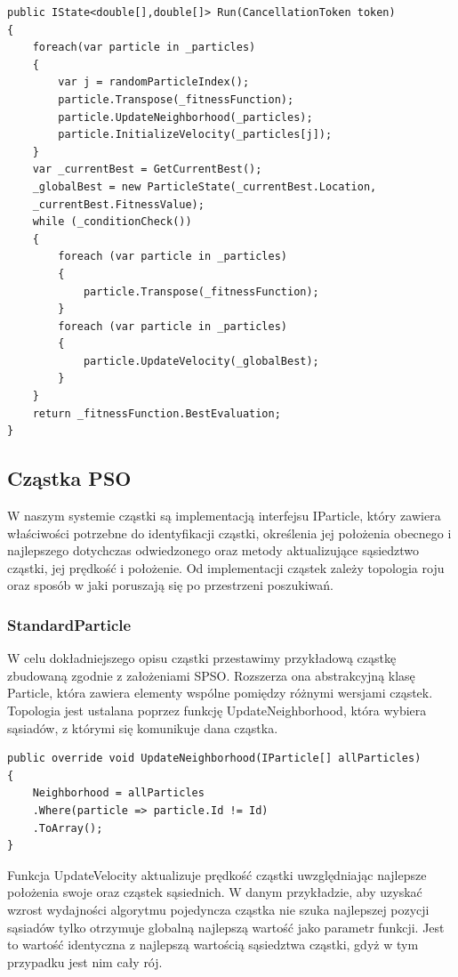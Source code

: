 \documentclass[12pt, twoside, openany, abstract=on]{report}
\theoremstyle{definition}
\begin{document}
\lstset{style=sharpc}
\begin{lstlisting}[frame=single]
public IState<double[],double[]> Run(CancellationToken token)
{
	foreach(var particle in _particles)
	{
		var j = randomParticleIndex();	      
		particle.Transpose(_fitnessFunction);
	    particle.UpdateNeighborhood(_particles);
		particle.InitializeVelocity(_particles[j]);
	}
	var _currentBest = GetCurrentBest();
	_globalBest = new ParticleState(_currentBest.Location,
	_currentBest.FitnessValue);
	while (_conditionCheck())
	{
		foreach (var particle in _particles)
		{
	    	particle.Transpose(_fitnessFunction);
	    }
		foreach (var particle in _particles)
	    {
			particle.UpdateVelocity(_globalBest);
		}
	}
	return _fitnessFunction.BestEvaluation;
}
\end{lstlisting}


\subsection{Cząstka PSO}
W naszym systemie cząstki są implementacją interfejsu IParticle, który zawiera właściwości potrzebne do identyfikacji cząstki, określenia jej położenia obecnego i najlepszego dotychczas odwiedzonego oraz metody   aktualizujące sąsiedztwo cząstki, jej prędkość i położenie. Od implementacji cząstek zależy topologia roju oraz sposób w jaki poruszają się po przestrzeni poszukiwań. 

\subsubsection{StandardParticle}
W celu dokładniejszego opisu cząstki przestawimy przykładową cząstkę zbudowaną zgodnie z założeniami SPSO.%
Rozszerza ona abstrakcyjną klasę Particle, która zawiera elementy wspólne pomiędzy różnymi wersjami cząstek. Topologia jest ustalana poprzez funkcję UpdateNeighborhood, która wybiera sąsiadów, z którymi się komunikuje dana cząstka.
\lstset{style=sharpc}
\begin{lstlisting}[frame=single]
public override void UpdateNeighborhood(IParticle[] allParticles)
{
	Neighborhood = allParticles
	.Where(particle => particle.Id != Id)
	.ToArray();
}
\end{lstlisting}

Funkcja UpdateVelocity aktualizuje prędkość cząstki uwzględniając najlepsze położenia swoje oraz cząstek sąsiednich. W danym przykładzie, aby uzyskać wzrost wydajności algorytmu pojedyncza cząstka nie szuka najlepszej pozycji sąsiadów tylko otrzymuje globalną najlepszą wartość jako parametr funkcji. Jest to wartość identyczna z najlepszą wartością sąsiedztwa cząstki, gdyż w tym przypadku jest nim cały rój.
\end{document}
